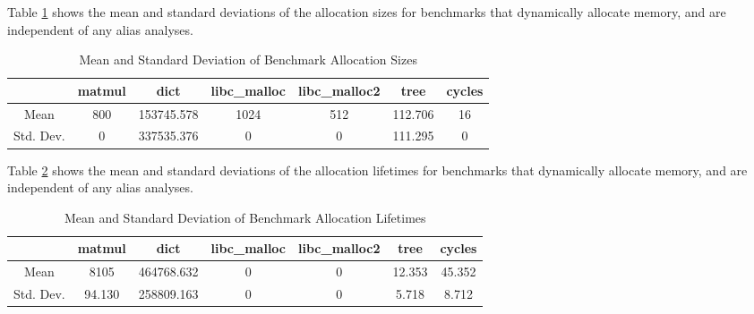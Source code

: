 Table \ref{table:6} shows the mean and standard deviations of the allocation sizes for benchmarks that dynamically allocate memory, and are independent of any alias analyses.

\begin{table} [h!]
\centering
   \begin{tabular} {|c|c c c c c c|}
      \hline
      & matmul & dict & libc\_malloc & libc\_malloc2 & tree & cycles \\
      \hline
      Mean & 800 & 153745.578 & 1024 & 512 & 112.706 & 16 \\
      \hline
      Std. Dev. & 0 & 337535.376 & 0 & 0 & 111.295 & 0 \\
      \hline
   \end{tabular}
   \caption{Mean and Standard Deviation of Benchmark Allocation Sizes}
   \label{table:6}
\end{table}

Table \ref{table:7} shows the mean and standard deviations of the allocation lifetimes for benchmarks that dynamically allocate memory, and are independent of any alias analyses.

\begin{table} [h!]
\centering
   \begin{tabular} {|c|c c c c c c|}
      \hline
      & matmul & dict & libc\_malloc & libc\_malloc2 & tree & cycles \\
      \hline
      Mean & 8105 & 464768.632 & 0 & 0 & 12.353 & 45.352 \\
      \hline
      Std. Dev. & 94.130 & 258809.163 & 0 & 0 & 5.718 & 8.712 \\
      \hline
   \end{tabular}
   \caption{Mean and Standard Deviation of Benchmark Allocation Lifetimes}
   \label{table:7}
\end{table}
